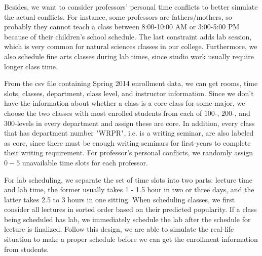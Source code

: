 \documentclass[11pt, oneside]{article}   	%
\begin{document}
Besides, we want to consider professors' personal time conflicts to better simulate the actual conflicts. For instance, some professors are fathers/mothers, so probably they cannot teach a class between 8:00-10:00 AM or 3:00-5:00 PM because of their children's school schedule. The last constraint adds lab session, which is very common for natural sciences classes in our college. Furthermore, we also schedule fine arts classes during lab times, since studio work usually require longer class time. 
\par From the csv file containing Spring 2014 enrollment data, we can get rooms, time slots, classes, department, class level, and instructor information. Since we don't have the information about whether a class is a core class for some major, we choose the two classes with most enrolled students from each of $100$-, $200$-, and $300$-levels in every department and assign these are core. In addition, every class that has department number "WRPR", i.e. is a writing seminar, are also labeled as core, since there must be enough writing seminars for first-years to complete their writing requirement. For professor's personal conflicts, we randomly assign $0-5$ unavailable time slots for each professor. 
\par For lab scheduling, we separate the set of time slots into two parts: lecture time and lab time, the former usually takes 1 - 1.5 hour in two or three days, and the latter takes 2.5 to 3 hours in one sitting. 
When scheduling classes, we first consider all lectures in sorted order based on their predicted popularity. If a class being scheduled has lab, we immediately schedule the lab after the schedule for lecture is finalized. %
Follow this design, we are able to simulate the real-life situation to make a proper schedule before we can get the enrollment information from students.
\end{document}
